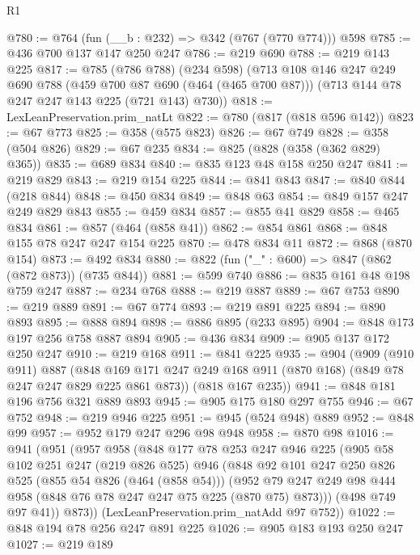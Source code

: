 \begin{lexlean}{R1}
\begin{coremodule}
@780 := @764 (fun (__b : @232) => @342 (@767 (@770 @774))) @598
@785 := @436 @700 @137 @147 @250 @247
@786 := @219 @690
@788 := @219 @143 @225
@817 := @785
    (@786 @788)
    (@234 @598)
    (@713
      @108
      @146
      @247
      @249
      @690
      @788
      (@459 @700 @87 @690 (@464 (@465 @700 @87)))
      (@713 @144 @78 @247 @247 @143 @225 (@721 @143) @730))
@818 := LexLeanPreservation.prim_natLt
@822 := @780 (@817 (@818 @596 @142))
@823 := @67 @773
@825 := @358 (@575 @823)
@826 := @67 @749
@828 := @358 (@504 @826)
@829 := @67 @235
@834 := @825 (@828 (@358 (@362 @829) @365))
@835 := @689 @834
@840 := @835 @123 @48 @158 @250 @247
@841 := @219 @829
@843 := @219 @154 @225
@844 := @841 @843
@847 := @840 @844 (@218 @844)
@848 := @450 @834
@849 := @848 @63
@854 := @849 @157 @247 @249 @829 @843
@855 := @459 @834
@857 := @855 @41 @829
@858 := @465 @834
@861 := @857 (@464 (@858 @41))
@862 := @854 @861
@868 := @848 @155 @78 @247 @247 @154 @225
@870 := @478 @834 @11
@872 := @868 (@870 @154)
@873 := @492 @834
@880 := @822 (fun ("_" : @600) => @847 (@862 (@872 @873)) (@735 @844))
@881 := @599 @740
@886 := @835 @161 @48 @198 @759 @247
@887 := @234 @768
@888 := @219 @887
@889 := @67 @753
@890 := @219 @889
@891 := @67 @774
@893 := @219 @891 @225
@894 := @890 @893
@895 := @888 @894
@898 := @886 @895 (@233 @895)
@904 := @848 @173 @197 @256 @758 @887 @894
@905 := @436 @834
@909 := @905 @137 @172 @250 @247
@910 := @219 @168
@911 := @841 @225
@935 := @904
    (@909
      (@910 @911)
      @887
      (@848 @169 @171 @247 @249 @168 @911 (@870 @168) (@849 @78 @247 @247 @829 @225 @861 @873))
      (@818 @167 @235))
@941 := @848 @181 @196 @756 @321 @889 @893
@945 := @905 @175 @180 @297 @755
@946 := @67 @752
@948 := @219 @946 @225
@951 := @945 (@524 @948) @889
@952 := @848 @99
@957 := @952 @179 @247 @296 @98 @948
@958 := @870 @98
@1016 := @941
    (@951
      (@957
        @958
        (@848
          @177
          @78
          @253
          @247
          @946
          @225
          (@905
            @58
            @102
            @251
            @247
            (@219 @826 @525)
            @946
            (@848
              @92
              @101
              @247
              @250
              @826
              @525
              (@855 @54 @826 (@464 (@858 @54)))
              (@952 @79 @247 @249 @98 @444 @958 (@848 @76 @78 @247 @247 @75 @225 (@870 @75) @873)))
            (@498 @749 @97 @41))
          @873))
      (LexLeanPreservation.prim_natAdd @97 @752))
@1022 := @848 @194 @78 @256 @247 @891 @225
@1026 := @905 @183 @193 @250 @247
@1027 := @219 @189

\end{coremodule}
\end{lexlean}
